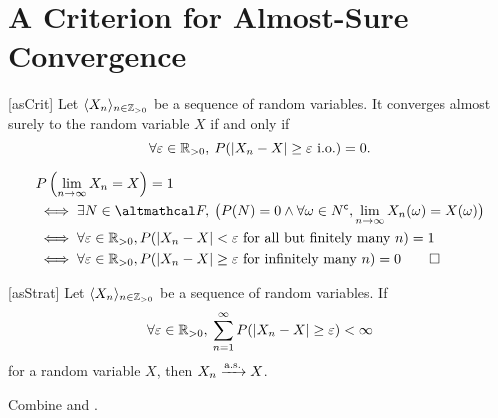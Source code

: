 \documentclass[../probability.tex]{subfiles}
\begin{document}
\section{A Criterion for Almost-Sure Convergence}

\begin{Theorem}{}[asCrit]
    Let \(\lang X_n \rang_{n \in \ZZ_{>0}}\) be a sequence of random variables.
    It converges almost surely to the random variable \(X\) if and only if
    \[
        \fall \veps \in \RR_{>0},\:P(|X_n - X| \ge \veps\text{ i.o.}) = 0\text.
    \]
\end{Theorem}
\begin{myproof}[Proof]
    \begin{align*}
        &P\left(\lim_{n \to \infty} X_n = X\right) = 1 \\
        &\iff \exs N \in \mcal{F},\:\bigl(P(N) = 0 \land \fall \omega \in N^\cmpl, \lim_{n \to \infty} X_n(\omega) = X(\omega)\bigr) \\
        &\iff \fall \veps \in \RR_{>0}, P(|X_n - X| < \veps \text{ for all but finitely many \(n\)}) = 1 \\
        &\iff \fall \veps \in \RR_{>0}, P(|X_n - X| \ge \veps \text{ for infinitely many \(n\)}) = 0 \qedhere
    \end{align*}
\end{myproof}

\begin{Corollary}{}[asStrat]
    Let \(\lang X_n \rang_{n \in \ZZ_{>0}}\) be a sequence of random variables.
    If
    \[
        \fall \veps \in \RR_{>0},\:
        \sum_{n=1}^\infty P(|X_n - X| \ge \veps) < \infty
    \]
    for a random variable \(X\), then \(X_n \xrightarrow{\mathrm{a.s.}} X\).
\end{Corollary}
\begin{myproof}[Proof]
    Combine  and .
\end{myproof}
\end{document}
